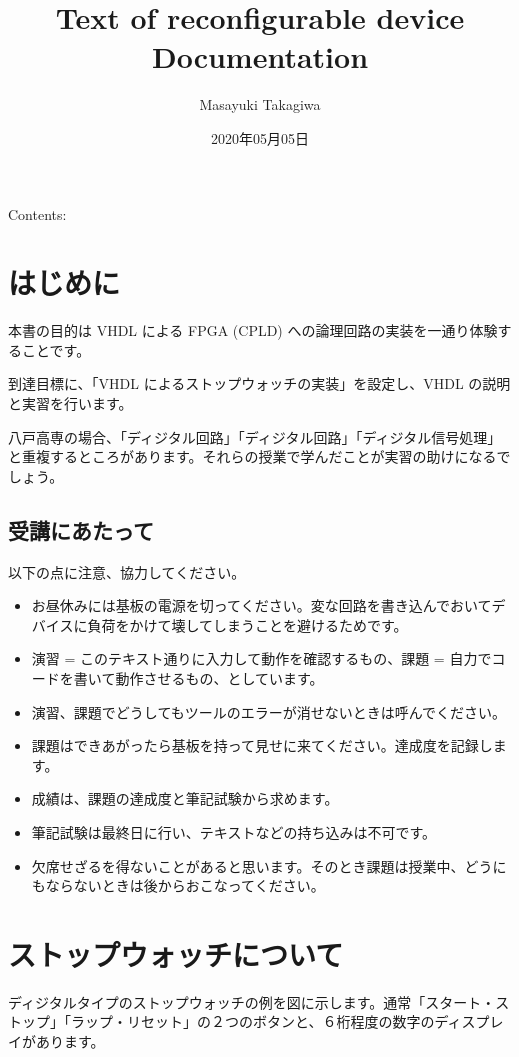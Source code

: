 \documentclass[letterpaper,10pt,dvipdfmx]{sphinxmanual}
\title{Text of reconfigurable device Documentation}
\date{2020年05月05日}
\author{Masayuki Takagiwa}
\begin{document}
\pagestyle{empty}
\sphinxmaketitle
\pagestyle{plain}
\sphinxtableofcontents
\pagestyle{normal}
\label{\detokenize{index::doc}}


Contents:


\chapter{はじめに}
\label{\detokenize{01_introduction:id1}}\label{\detokenize{01_introduction::doc}}
本書の目的は VHDL による FPGA (CPLD) への論理回路の実装を一通り体験することです。

到達目標に、「VHDL によるストップウォッチの実装」を設定し、VHDL の説明と実習を行います。

八戸高専の場合、「ディジタル回路」「ディジタル回路」「ディジタル信号処理」と重複するところがあります。それらの授業で学んだことが実習の助けになるでしょう。


\section{受講にあたって}
\label{\detokenize{01_introduction:id2}}
以下の点に注意、協力してください。
\begin{itemize}
\item {} 
お昼休みには基板の電源を切ってください。変な回路を書き込んでおいてデバイスに負荷をかけて壊してしまうことを避けるためです。

\item {} 
演習 = このテキスト通りに入力して動作を確認するもの、課題 = 自力でコードを書いて動作させるもの、としています。

\item {} 
演習、課題でどうしてもツールのエラーが消せないときは呼んでください。

\item {} 
課題はできあがったら基板を持って見せに来てください。達成度を記録します。

\item {} 
成績は、課題の達成度と筆記試験から求めます。

\item {} 
筆記試験は最終日に行い、テキストなどの持ち込みは不可です。

\item {} 
欠席せざるを得ないことがあると思います。そのとき課題は授業中、どうにもならないときは後からおこなってください。

\end{itemize}


\chapter{ストップウォッチについて}
\label{\detokenize{02_stopwatch:id1}}\label{\detokenize{02_stopwatch::doc}}
ディジタルタイプのストップウォッチの例を図に示します。通常「スタート・ストップ」「ラップ・リセット」の２つのボタンと、６桁程度の数字のディスプレイがあります。
\end{document}
